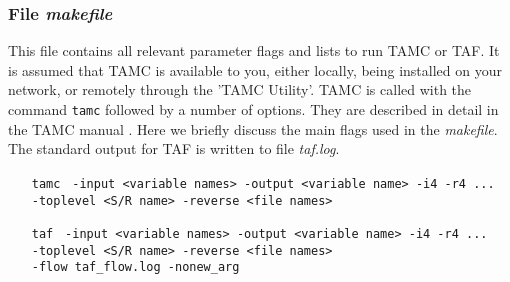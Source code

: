 \subsubsection{File {\it makefile}}

This file contains all relevant parameter flags and
lists to run TAMC or TAF.
It is assumed that TAMC is available to you, either locally,
being installed on your network, or remotely through the 'TAMC Utility'.
TAMC is called with the command {\tt tamc} followed by a
number of options. They are described in detail in the
TAMC manual \cite{gie:99}.
Here we briefly discuss the main flags used in the {\it makefile}.
The standard output for TAF is written to file
{\it taf.log}.
%
\begin{itemize}
\item [{\tt tamc}] {\tt
-input <variable names>
-output <variable name> -i4 -r4 ... \\
-toplevel <S/R name> -reverse <file names> 
}
\item [{\tt taf}] {\tt
-input <variable names>
-output <variable name> -i4 -r4 ... \\
-toplevel <S/R name> -reverse <file names> \\
-flow taf\_flow.log -nonew\_arg
}
\end{itemize}
%

